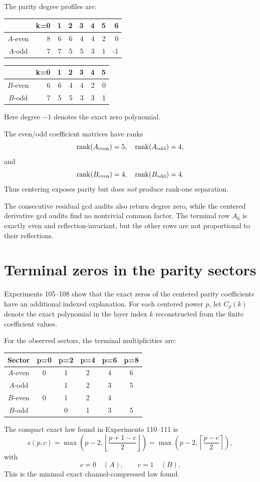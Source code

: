 \documentclass[11pt,a4paper]{article}
\newcommand{\floor}[1]{\left\lfloor #1 \right\rfloor}
\newcommand{\ceil}[1]{\left\lceil #1 \right\rceil}
\newcommand{\rank}{\operatorname{rank}}
\begin{document}
The parity degree profiles are:
\begin{center}
\begin{tabular}{c|rrrrrrr}
\toprule
&k=0&1&2&3&4&5&6\\
\midrule
$A$-even &8&6&6&4&4&2&0\\
$A$-odd  &7&7&5&5&3&1&-1\\
\bottomrule
\end{tabular}
\qquad
\begin{tabular}{c|rrrrrr}
\toprule
&k=0&1&2&3&4&5\\
\midrule
$B$-even &6&6&4&4&2&0\\
$B$-odd  &7&5&5&3&3&1\\
\bottomrule
\end{tabular}
\end{center}
Here degree $-1$ denotes the exact zero polynomial.

The even/odd coefficient matrices have ranks
\[
\rank(A_{\rm even})=5,\quad \rank(A_{\rm odd})=4,
\]
and
\[
\rank(B_{\rm even})=4,\quad \rank(B_{\rm odd})=4.
\]
Thus centering exposes parity but does \emph{not} produce rank-one separation.

The consecutive residual gcd audits also return degree zero, while the centered derivative gcd audits find no nontrivial common factor.  The terminal row $A_6$ is exactly even and reflection-invariant, but the other rows are not proportional to their reflections.

\section{Terminal zeros in the parity sectors}

Experiments 105--108 show that the exact zeros of the centered parity coefficients have an additional indexed explanation.  For each centered power $p$, let $C_p(k)$ denote the exact polynomial in the layer index $k$ reconstructed from the finite coefficient values.

For the observed sectors, the terminal multiplicities are:
\begin{center}
\begin{tabular}{c|ccccc}
\toprule
Sector & p=0&p=2&p=4&p=6&p=8\\
\midrule
$A$-even &0&1&2&4&6\\
$A$-odd  &&1&2&3&5\\
$B$-even &0&1&2&4&\\
$B$-odd  &&0&1&3&5\\
\bottomrule
\end{tabular}
\end{center}
The compact exact law found in Experiments 110--111 is
\begin{equation}
\label{eq:supportlaw}
s(p,c)=\max\!\left(p-2,\floor{\frac{p+1-c}{2}}\right)
=\max\!\left(p-2,\ceil{\frac{p-c}{2}}\right),
\end{equation}
with
\[
c=0\quad(A),\qquad c=1\quad(B).
\]
This is the minimal exact channel-compressed law found.
\end{document}
